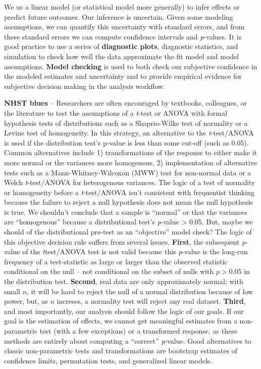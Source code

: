 \documentclass[]{book}
\begin{document}
We us a linear model (or statistical model more generally) to infer effects or predict future outcomes. Our inference is uncertain. Given some modeling assumptions, we can quantify this uncertainty with standard errors, and from these standard errors we can compute confidence intervals and \emph{p}-values. It is good practice to use a series of \textbf{diagnostic plots}, diagnostic statistics, and simulation to check how well the data approximate the fit model and model assumptions. \textbf{Model checking} is used to both check our subjective confidence in the modeled estimates and uncertainty and to provide empirical evidence for subjective decision making in the analysis workflow.

\textbf{NHST blues} -- Researchers are often encouraged by textbooks, colleagues, or the literature to test the assumptions of a \emph{t}-test or ANOVA with formal hypothesis tests of distributions such as a Shaprio-Wilks test of normality or a Levine test of homogeneity. In this strategy, an alternative to the \emph{t}-test/ANOVA is used if the distribution test's p-value is less than some cut-off (such as 0.05). Common alternatives include 1) transformations of the response to either make it more normal or the variances more homogenous, 2) implementation of alternative tests such as a Mann-Whitney-Wilcoxon (MWW) test for non-normal data or a Welch \emph{t}-test/ANOVA for heterogenous variances. The logic of a test of normality or homogeneity before a \emph{t}-test/ANOVA isn't consistent with frequentist thinking because the failure to reject a null hypothesis does not mean the null hypothesis is true. We shouldn't conclude that a sample is ``normal'' or that the variances are ``homogenous'' because a distributional test's \emph{p}-value \textgreater{} 0.05. But, maybe we should of the distributional pre-test as an ``objective'' model check? The logic of this objective decision rule suffers from several issues. \textbf{First}, the subsequent \emph{p}-value of the \emph{t}test/ANOVA test is not valid because this \emph{p}-value is the long-run frequency of a test-statistic as large or larger than the observed statistic conditional on the null -- not conditional on the subset of nulls with \(p > 0.05\) in the distribution test. \textbf{Second}, real data are only approximately normal; with small \(n\), it will be hard to reject the null of a normal distribution because of low power, but, as \(n\) increses, a normality test will reject any real dataset. \textbf{Third}, and most importantly, our analysis should follow the logic of our goals. If our goal is the estimation of effects, we cannot get meaningful estimates from a non-parametric test (with a few exceptions) or a transformed response, as these methods are entirely about computing a ``correct'' \emph{p}-value. Good alternatives to classic non-parametric tests and transformations are bootstrap estimates of confidence limits, permutation tests, and generalized linear models.
\end{document}
